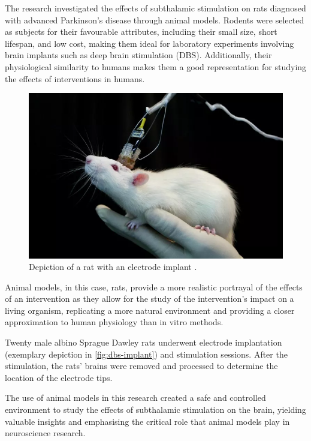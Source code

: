 \documentclass[10pt]{article}
\begin{document}
\begin{sloppypar}
  The research investigated the effects of subthalamic stimulation on rats diagnosed with advanced Parkinson’s disease through animal models. Rodents were selected as subjects for their favourable attributes, including their small size, short lifespan, and low cost, making them ideal for laboratory experiments involving brain implants such as deep brain stimulation (DBS). Additionally, their physiological similarity to humans makes them a good representation for studying the effects of interventions in humans.

  \begin{figure}[ht]
    \centering
    \includegraphics[width=\textwidth]{figures/scientist-deep-brain-stimulation.png}
    \caption[Depiction of a rat with an electrode implant]{Depiction of a rat with an electrode implant \citep{sharma_scientists_2017}.}
    \label{fig:dbs-implant}
  \end{figure}

  Animal models, in this case, rats, provide a more realistic portrayal of the effects of an intervention as they allow for the study of the intervention’s impact on a living organism, replicating a more natural environment and providing a closer approximation to human physiology than in vitro methods.

  Twenty male albino Sprague Dawley rats underwent electrode implantation (exemplary depiction in \autoref{fig:dbs-implant}) and stimulation sessions. After the stimulation, the rats’ brains were removed and processed to determine the location of the electrode tips.

  The use of animal models in this research created a safe and controlled environment to study the effects of subthalamic stimulation on the brain, yielding valuable insights and emphasising the critical role that animal models play in neuroscience research.


\end{sloppypar}
\end{document}
